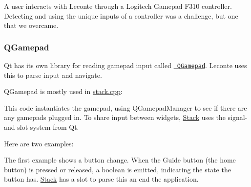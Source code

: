 A user interacts with Leconte through a Logitech Gamepad F310 controller. Detecting and using the unique inputs of a controller was a challenge, but one that we overcame.

\subsubsection*{Q\+Gamepad}

Qt has its own library for reading gamepad input called \href{https://doc.qt.io/qt-5/qgamepad.html}{\texttt{ Q\+Gamepad}}. Leconte uses this to parse input and navigate.

Q\+Gamepad is mostly used in {\ttfamily \mbox{\hyperlink{stack_8cpp}{stack.\+cpp}}}\+: 
\begin{DoxyCode}{0}
\DoxyCodeLine{\textcolor{preprocessor}{\#include <QtGamepad/QGamepad>}}
\DoxyCodeLine{    \textcolor{keywordflow}{return};}
\DoxyCodeLine{\}}
\end{DoxyCode}


This code instantiates the gamepad, using Q\+Gamepad\+Manager to see if there are any gamepads plugged in. To share input between widgets, \mbox{\hyperlink{classStack}{Stack}} uses the signal-\/and-\/slot system from Qt.

Here are two examples\+: 
\begin{DoxyCode}{0}
\end{DoxyCode}


The first example shows a button change. When the Guide button (the home button) is pressed or released, a boolean is emitted, indicating the state the button has. \mbox{\hyperlink{classStack}{Stack}} has a slot to parse this an end the application.


\begin{DoxyCode}{0}
\DoxyCodeLine{}
\DoxyCodeLine{    \}}
\DoxyCodeLine{\}}
\end{DoxyCode}


